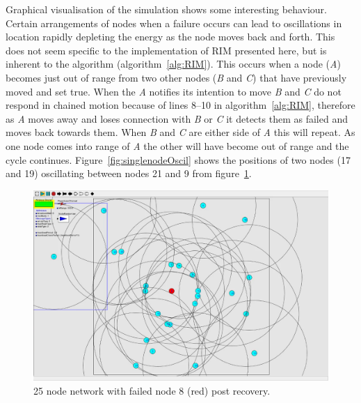 \documentclass[authoryearcitations]{UoYCSproject}
\begin{document}
Graphical visualisation of the simulation shows some interesting behaviour. Certain arrangements of nodes when a failure occurs can lead to oscillations in location rapidly depleting the energy as the node moves back and forth. This does not seem specific to the implementation of RIM presented here, but is inherent to the algorithm (algorithm~\ref{alg:RIM}). This occurs when a node (\emph{A}) becomes just out of range from two other nodes (\emph{B} and \emph{C}) that have previously moved and set  true. When the \emph{A} notifies its intention to move \emph{B} and \emph{C} do not respond in chained motion because of lines 8--10 in algorithm~\ref{alg:RIM}, therefore as \emph{A} moves away and loses connection with \emph{B} or \emph{C} it detects them as failed and moves back towards them. When \emph{B} and \emph{C} are either side of \emph{A} this will repeat. As one node comes into range of \emph{A} the other will have become out of range and the cycle continues. Figure~\ref{fig:singlenodeOscil} shows the positions of two nodes (17 and 19) oscillating between nodes 21 and 9 from figure~\ref{fig:singlenodePost}.

\begin{figure}
 \centering
    \includegraphics[width=\textwidth]{figures/singlenodePost.png}
    \caption{25 node network with failed node 8 (red) post recovery.}
    \label{fig:singlenodePost}
\end{figure}
\end{document}
